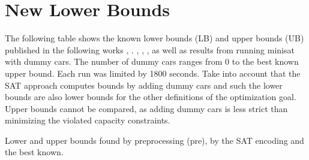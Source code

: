 \documentclass[]{llncs}
\begin{document}
\section{New Lower Bounds}

The following table shows the known lower bounds (LB) and upper bounds (UB) published in the following works \cite{Regin97},
\cite{Gent98}. \cite{Gottlieb03}, \cite{Gravel05}, \cite{Estellon06}, as well as results from running minisat with dummy
cars. The number of dummy cars ranges from 0 to the best known upper bound. Each run was limited by 1800 seconds. Take
into account that the SAT approach computes bounds by adding dummy cars and such the lower bounds are also lower bounds
for the other definitions of the optimization goal. Upper bounds cannot be compared, as adding dummy cars is less strict
than minimizing the violated capacity constraints.

\begin{table}[htbp]
    \caption{Lower and upper bounds found by preprocessing (pre), by the SAT encoding and the best known. }
    \centering
    
    \label{tab:1}
\end{table}



\end{document}
